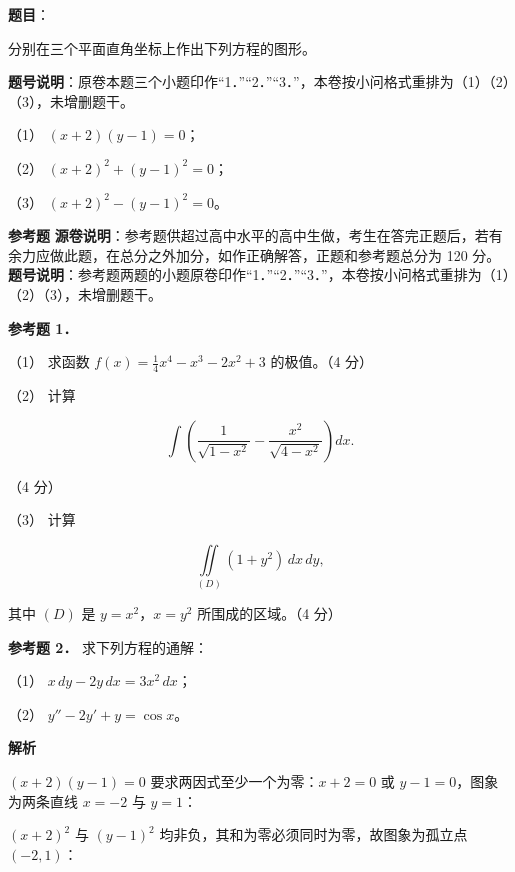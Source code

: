 \begin{answer}

\textbf{题目}：

分别在三个平面直角坐标上作出下列方程的图形。

\begin{gktip}
\textbf{题号说明}：原卷本题三个小题印作“1．”“2．”“3．”，本卷按小问格式重排为（1）（2）（3），未增删题干。
\end{gktip}

（1） $(x+2)(y-1)=0$；

（2） $(x+2)^2+(y-1)^2=0$；

（3） $(x+2)^2-(y-1)^2=0$。

\begin{gktip}
\textbf{参考题}
\textbf{源卷说明}：参考题供超过高中水平的高中生做，考生在答完正题后，若有余力应做此题，在总分之外加分，如作正确解答，正题和参考题总分为 120 分。
\textbf{题号说明}：参考题两题的小题原卷印作“1．”“2．”“3．”，本卷按小问格式重排为（1）（2）（3），未增删题干。
\end{gktip}

\textbf{参考题 1．}

（1） 求函数 $f(x)=\frac14x^4-x^3-2x^2+3$ 的极值。（4 分）

（2） 计算

\nopagebreak[4]
\[
\int\left(\frac{1}{\sqrt{1-x^2}}-\frac{x^2}{\sqrt{4-x^2}}\right)dx.
\]

（4 分）

（3） 计算

\nopagebreak[4]
\[
\iint\limits_{(D)}(1+y^2)\,dx\,dy,
\]

其中 $(D)$ 是 $y=x^2$，$x=y^2$ 所围成的区域。（4 分）

\textbf{参考题 2．} 求下列方程的通解：

（1） $x\,dy-2y\,dx=3x^2\,dx$；

（2） $y''-2y'+y=\cos x$。

\textbf{解析}


$(x+2)(y-1)=0$ 要求两因式至少一个为零：$x+2=0$ 或 $y-1=0$，图象为两条直线 $x=-2$ 与 $y=1$：
\nopagebreak[4]
\begin{center}\end{center}
\nopagebreak[4]

$(x+2)^2$ 与 $(y-1)^2$ 均非负，其和为零必须同时为零，故图象为孤立点 $(-2,1)$：
\nopagebreak[4]
\begin{center}\end{center}
\nopagebreak[4]


\end{answer}
